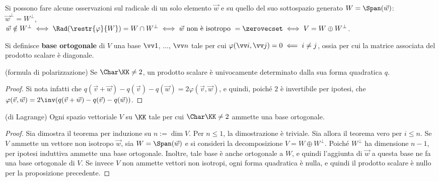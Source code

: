 \documentclass[11pt]{article}
\begin{document}
	\begin{remark}
		Si possono fare alcune osservazioni sul radicale di un solo elemento $\vec w$ e su quello del suo sottospazio
		generato $W = \Span(\vec w)$: \\
		
		\li $\vec w ^\perp = W^\perp$, \\
		\li $\vec w \notin W^\perp \iff \Rad (\restr{\varphi}{W}) = W \cap W^\perp \iff \vec w \text{ non è isotropo } = \zerovecset \iff
		V = W \oplus W^\perp$.
	\end{remark}

	\begin{definition}
		Si definisce \textbf{base ortogonale} di $V$ una base $\vv 1$, ..., $\vv n$ tale per cui $\varphi(\vv i, \vv j) = 0
		\impliedby i \neq j$, ossia per cui la matrice associata del prodotto scalare è diagonale. 
	\end{definition}

	\begin{proposition} (formula di polarizzazione)
		Se $\Char \KK \neq 2$, un prodotto scalare è univocamente determinato dalla sua forma quadratica $q$.
	\end{proposition}

	\begin{proof}
		Si nota infatti che $q(\vec v + \vec w) - q(\vec v) - q(\vec w) = 2 \varphi(\vec v, \vec w)$, e quindi,
		poiché $2$ è invertibile per ipotesi, che $\varphi(\vec v, \vec w) = 2\inv (q(\vec v + \vec w) - q(\vec v) - q(\vec w))$.
	\end{proof}

	\begin{theorem}(di Lagrange)
		Ogni spazio vettoriale $V$ su $\KK$ tale per cui $\Char \KK \neq 2$ ammette una base ortogonale.
	\end{theorem}

	\begin{proof}
		Sia dimostra il teorema per induzione su $n := \dim V$. Per $n \leq 1$, la dimostrazione è triviale. Sia
		allora il teorema vero per $i \leq n$. Se $V$ ammette un vettore non isotropo $\vec w$, sia $W = \Span(\vec w)$ e si consideri la decomposizione $V = W \oplus W^\perp$. Poiché $W^\perp$ ha dimensione $n-1$, per ipotesi induttiva
		ammette una base ortogonale. Inoltre, tale base è anche ortogonale a $W$, e quindi l'aggiunta di $\vec w$ a
		questa base ne fa una base ortogonale di $V$. Se invece $V$ non ammette vettori non isotropi, ogni forma quadratica
		è nulla, e quindi il prodotto scalare è nullo per la proposizione precedente.
	\end{proof}
\end{document}
